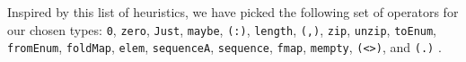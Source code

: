 \documentclass{article}
\begin{document}
Inspired by this list of heuristics,
we have picked the following set of operators for our chosen types:
\verb|0|, %
\verb|zero|, %
\verb|Just|, %
\verb|maybe|, %
\verb|(:)|, %
\verb|length|, %
\verb|(,)|, %
\verb|zip|, %
\verb|unzip|, %
\verb|toEnum|, %
\verb|fromEnum|, %
\verb|foldMap|, %
\verb|elem|, %
\verb|sequenceA|, %
\verb|sequence|, %
\verb|fmap|, %
\verb|mempty|, %
\verb|(<>)|, %
and \verb|(.)|%
. %
\end{document}
